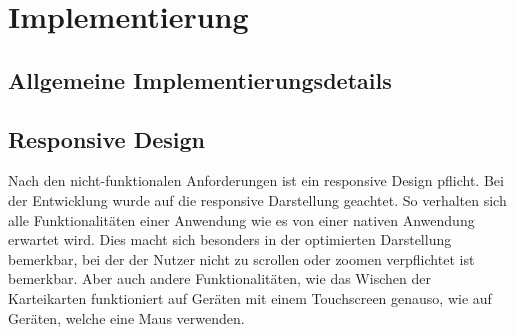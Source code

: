 \chapter{Implementierung}






\section{Allgemeine Implementierungsdetails}



\section{Responsive Design} %
Nach den nicht-funktionalen Anforderungen ist ein responsive Design pflicht.  
Bei der Entwicklung wurde auf die responsive Darstellung geachtet.
So verhalten sich alle Funktionalitäten einer Anwendung wie es von einer nativen Anwendung erwartet wird.
Dies macht sich besonders in der optimierten Darstellung bemerkbar, bei der der Nutzer nicht zu scrollen oder zoomen verpflichtet ist bemerkbar.
Aber auch andere Funktionalitäten, wie das Wischen der Karteikarten funktioniert auf Geräten mit einem Touchscreen genauso, wie auf Geräten, welche eine Maus verwenden.






